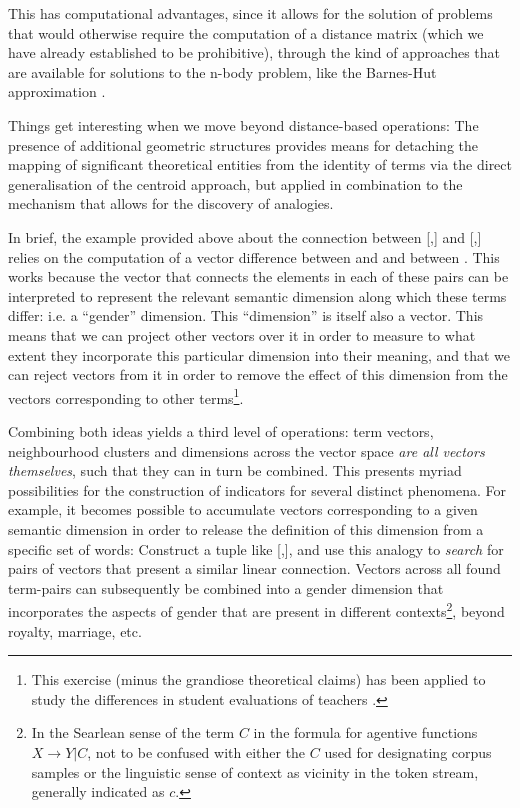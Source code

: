 This has computational advantages, since it allows for the solution of problems that would otherwise require the computation of a distance matrix (which we have already established to be prohibitive), through the kind of approaches that are available for solutions to the n-body problem, like the Barnes-Hut approximation \citep{pfalzner1996}.

Things get interesting when we move beyond distance-based operations:
The presence of additional geometric structures provides means for detaching the mapping of significant theoretical entities from the identity of terms via the direct generalisation of the centroid approach, but applied in combination to the mechanism that allows for the discovery of analogies.

In brief, the example provided above about the connection between [,] and [,] relies on the computation of a vector difference between  and  and between .
This works because the vector that connects the elements in each of these pairs can be interpreted to represent the relevant semantic dimension along which these terms differ: i.e. a ``gender'' dimension.
This ``dimension'' is itself also a vector.
This means that we can project other vectors over it in order to measure to what extent they incorporate this particular dimension into their meaning, and that we can reject vectors from it in order to remove the effect of this dimension from the vectors corresponding to other terms\footnote{
    This exercise (minus the grandiose theoretical claims) has been applied to study the differences in student evaluations of teachers \citep{schmidt2016}.
}.

Combining both ideas yields a third level of operations: term vectors, neighbourhood clusters and dimensions across the vector space \emph{are all vectors themselves}, such that they can in turn be combined.
This presents myriad possibilities for the construction of indicators for several distinct phenomena.
For example, it becomes possible to accumulate vectors corresponding to a given semantic dimension in order to release the definition of this dimension from a specific set of words:
Construct a tuple like [,], and use this analogy to \emph{search} for pairs of vectors that present a similar linear connection.
Vectors across all found term-pairs can subsequently be combined into a gender dimension that incorporates the aspects of gender that are present in different contexts\footnote{
    In the Searlean sense of the term $C$ in the formula for agentive functions $X \rightarrow Y | C$, not to be confused with either the $C$ used for designating corpus samples or the linguistic sense of context as vicinity in the token stream, generally indicated as $c$.
}, beyond royalty, marriage, etc.

